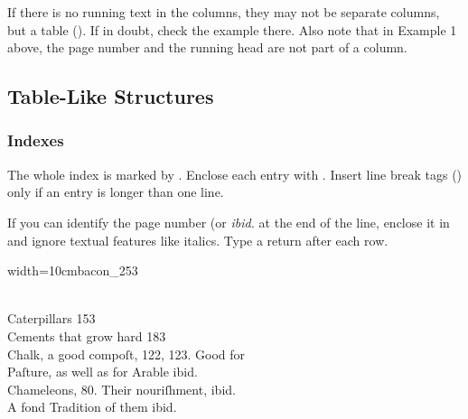 \begin{note}
If there is no running text in the columns, they may not be separate columns, but a table (). If in doubt, check the example there. Also note that in Example 1 above, the page number and the running head are not part of a column.
\end{note}



\tocspace
\subsection{Table-Like Structures}
\label{section table-like structures}

\subsubsection{Indexes}
\label{section indexes}

\begin{mainrule}
  The whole index is marked by . Enclose each entry with . Insert line break tags () only if an entry is longer than one line.

  If you can identify the page number (or \emph{ibid.} at the end of the line, enclose it in  and ignore textual features like italics. Type a return after each row.
\end{mainrule}



\begin{sampleImageSmall}[ 1]{width=10cm}{bacon_253}

\begin{typeLatin}
 \\
Caterpillars  153 \\
Cements that grow hard  183 \\
Chalk, a good compoſt, 122, 123. Good for \\
Paſture, as well as for Arable  ibid. \\
Chameleons, 80. Their nouriſhment,  ibid. \\
A fond Tradition of them ibid. \\
\end{typeLatin}
\end{sampleImageSmall}

